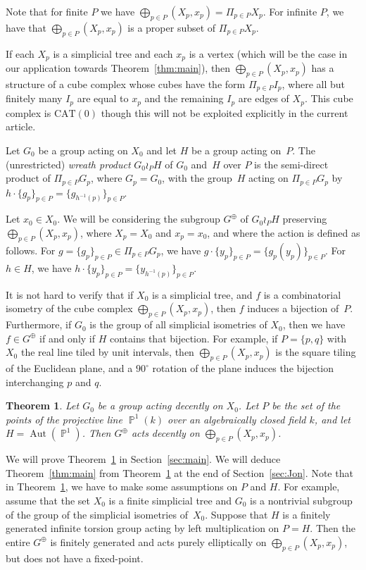 \documentclass[11pt]{article}
\numberwithin{equation}{section}
\newcommand{\CAT}{\mathrm{CAT}}
\newcommand{\p}{\operatorname{\mathbb{P}}}\let\P\p
\newcommand{\Aut}{\operatorname{Aut}}
\theoremstyle{plain}
\newtheorem{theorem}{Theorem}[section]
\theoremstyle{definition}
\begin{document}
Note that for finite $P$ we have $\bigoplus_{p\in P} (X_p,x_p)=\Pi_{p\in P} X_p$. For infinite $P$, we have that
$\bigoplus_{p\in P} (X_p,x_p)$ is a proper subset of $\Pi_{p\in P} X_p$.

If each $X_p$ is a simplicial tree and each $x_p$ is a vertex (which will be the case in our application towards Theorem~\ref{thm:main}), then $\bigoplus_{p\in P} (X_p,x_p)$ has a structure of a cube complex {whose cubes have the form $\Pi_{p\in P} I_p$, where all but finitely many $I_p$ are equal to $x_p$ and the remaining $I_p$ are edges of $X_p$}. This cube complex is $\CAT(0)$ though this will not be exploited explicitly in the current article.

Let $G_0$ be a group acting on $X_0$ and let $H$ be a group acting on~$P$. The (unrestricted) \emph{wreath product} $G_0\wr_P H$ of $G_0$ and~$H$ over $P$ is the semi-direct product of $\Pi_{p\in P} G_p$, where $G_p=G_0$, with the group~$H$ acting on $\Pi_{p\in P} G_p$ by $h\cdot \{g_p\}_{p\in P}=\{g_{h^{-1}(p)}\}_{p\in P}$.

Let $x_0\in X_0$. We will be considering the subgroup $G^\oplus$ of $G_0\wr_P H$ preserving $\bigoplus_{p\in P} (X_p,x_p)$, where $X_p=X_0$ and $x_p=x_0$, and where the action is defined as follows. For $g=\{g_p\}_{p\in P}\in \Pi_{p\in P}G_p$, we have $g \cdot \{y_p\}_{p\in P}=\{g_p(y_p)\}_{p\in P}$. For $h\in H$, we have $h\cdot \{y_p\}_{p\in P}=\{y_{h^{-1}(p)}\}_{p\in P}$.

It is not hard to verify that if $X_0$ is a simplicial tree, and $f$ is a combinatorial isometry of the cube complex $\bigoplus_{p\in P} (X_p,x_p)$, then $f$ induces a bijection of~$P$. Furthermore, if $G_0$ is the group of all simplicial isometries of $X_0$, then we have $f\in G^\oplus$ if and only if $H$ contains that bijection. For example, if $P=\{p,q\}$ with $X_0$ the real line tiled by unit intervals, then $\bigoplus_{p\in P} (X_p,x_p)$ is the square tiling of the Euclidean plane, and a $90^\circ$ rotation of the plane induces the bijection interchanging $p$ and $q$.

\begin{theorem}
\label{thm:maing}
Let $G_0$ be a group acting decently on $X_0$. Let $P$ be the set of {the points of the projective line $\p^1(k)$} over an algebraically closed field $k$, and let $H=\Aut(\p^1)$. Then $G^\oplus$ acts decently on $\bigoplus_{p\in P} (X_p,x_p)$. \end{theorem}

We will prove Theorem~\ref{thm:maing} in Section~\ref{sec:main}. {We will deduce Theorem~\ref{thm:main} from Theorem~\ref{thm:maing} at the end of Section~\ref{sec:Jon}}.
Note that in Theorem~\ref{thm:maing}, we have to make some assumptions on $P$ and $H$. For example, assume that the set $X_0$ is {a finite simplicial tree and $G_0$ is a nontrivial subgroup of the group of the simplicial isometries of~$X_0$}. Suppose that $H$ is a finitely generated infinite torsion group acting by left multiplication on $P=H$. Then the entire $G^\oplus$ is finitely generated and acts purely elliptically on $\bigoplus_{p\in P} (X_p,x_p)$, but does not have a fixed-point.
\end{document}
